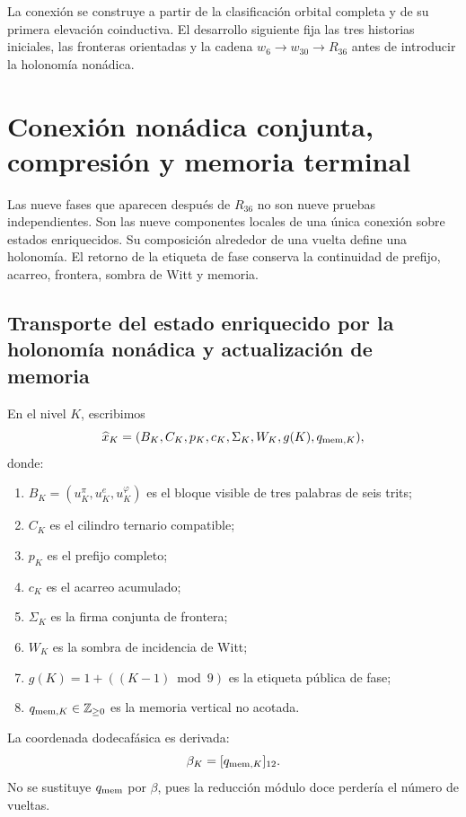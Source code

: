 \label{chap:83-07}

La conexión se construye a partir de la clasificación orbital completa y de
su primera elevación coinductiva. El desarrollo siguiente fija las tres
historias iniciales, las fronteras orientadas y la cadena
\(w_6\to w_{30}\to R_{36}\) antes de introducir la holonomía nonádica.

\begin{HMTScientificOwnerSubordinated}

\end{HMTScientificOwnerSubordinated}


\section{Conexión nonádica conjunta, compresión y memoria terminal}
\label{p12-83-c7-s1:chap:conexion-nonadica-conjunta}

Las nueve fases que aparecen después de \(R_{36}\) no son nueve pruebas
independientes. Son las nueve componentes locales de una única conexión
sobre estados enriquecidos. Su composición alrededor de una vuelta define
una holonomía. El retorno de la etiqueta de fase conserva la continuidad de
prefijo, acarreo, frontera, sombra de Witt y memoria.

\subsection{Transporte del estado enriquecido por la holonomía nonádica y actualización de memoria}

En el nivel \(K\), escribimos
\[
 \widehat x_K=
 (B_K,C_K,p_K,c_K,\Sigma_K,W_K,g(K),q_{{\rm mem},K}),
\]
donde:
\begin{enumerate}
 \item \(B_K=(u_K^\pi,u_K^e,u_K^\varphi)\) es el bloque visible de tres
       palabras de seis trits;
 \item \(C_K\) es el cilindro ternario compatible;
 \item \(p_K\) es el prefijo completo;
 \item \(c_K\) es el acarreo acumulado;
 \item \(\Sigma_K\) es la firma conjunta de frontera;
 \item \(W_K\) es la sombra de incidencia de Witt;
 \item \(g(K)=1+((K-1)\bmod9)\) es la etiqueta pública de fase;
 \item \(q_{{\rm mem},K}\in\mathbb Z_{\geq0}\) es la memoria vertical no
       acotada.
\end{enumerate}
La coordenada dodecafásica es derivada:
\[
 \beta_K=[q_{{\rm mem},K}]_{12}.
\]
No se sustituye \(q_{\rm mem}\) por \(\beta\), pues la reducción módulo
doce perdería el número de vueltas.

